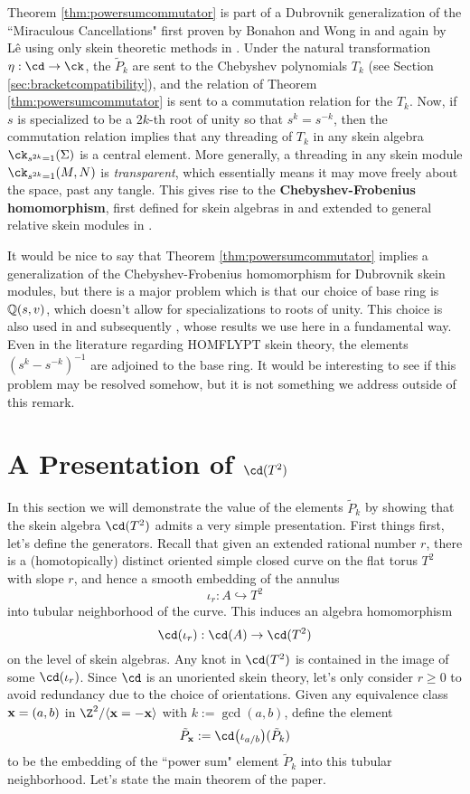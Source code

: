 \begin{remark}
Theorem \ref{thm:powersumcommutator} is part of a Dubrovnik generalization of the ``Miraculous Cancellations" first proven by Bonahon and Wong in  and again by Lê using only skein theoretic methods in . Under the natural transformation $\eta:\cd \to \ck$, the $\tilde{P}_k$ are sent to the Chebyshev polynomials $T_k$ (see Section \ref{sec:bracketcompatibility}), and the relation of Theorem \ref{thm:powersumcommutator} is sent to a commutation relation for the $T_k$. Now, if $s$ is specialized to be a $2k$-th root of unity so that $s^k = s^{-k}$, then the commutation relation implies that any threading of $T_k$ in any skein algebra $\ck_{s^{2k}=1}(\Sigma)$ is a central element. More generally, a threading in any skein module $\ck_{s^{2k}=1}(M, N)$ is \textit{transparent}, which essentially means it may move freely about the space, past any tangle. This gives rise to the \textbf{Chebyshev-Frobenius homomorphism}, first defined for skein algebras in  and extended to general relative skein modules in .

It would be nice to say that Theorem \ref{thm:powersumcommutator} implies a generalization of the Chebyshev-Frobenius homomorphism for Dubrovnik skein modules, but there is a major problem which is that our choice of base ring is $\mathbb{Q}(s,v)$, which doesn't allow for specializations to roots of unity. This choice is also used in  and subsequently , whose results we use here in a fundamental way. Even in the literature regarding HOMFLYPT skein theory, the elements $(s^k - s^{-k})^{-1}$ are adjoined to the base ring. It would be interesting to see if this problem may be resolved somehow, but it is not something we address outside of this remark. 
\end{remark}


\section{A Presentation of $\cd(T^2)$} \label{sec:presentation}

In this section we will demonstrate the value of the elements $\tilde{P}_k$  by showing that the skein algebra $\cd(T^2)$ admits a very simple presentation. First things first, let's define the generators. Recall that given an extended rational number $r$, there is a (homotopically) distinct oriented simple closed curve on the flat torus $T^2$ with slope $r$, and hence a smooth embedding of the annulus 
\[
\iota_r: A \hookrightarrow T^2
\]
into tubular neighborhood of the curve. This induces an algebra homomorphism
\[
\cd(\iota_r): \cd(A) \to \cd(T^2)
\]
on the level of skein algebras. Any knot in $\cd(T^2)$ is contained in the image of some $\cd(\iota_r)$. Since $\cd$ is an unoriented skein theory, let's only consider $r \geq 0$ to avoid redundancy due to the choice of orientations. Given any equivalence class ${\mathbf{x}} = (a, b)$ in $\Z^2 / \langle \xx = - \xx \rangle$ with $k := \gcd(a, b)$, define the element
\[
\tilde{P}_\xx := \cd\big(\iota_{a/b}\big)(\tilde{P}_k)
\]
to be the embedding of the ``power sum" element $\tilde{P}_k$ into this tubular neighborhood. Let's state the main theorem of the paper.

